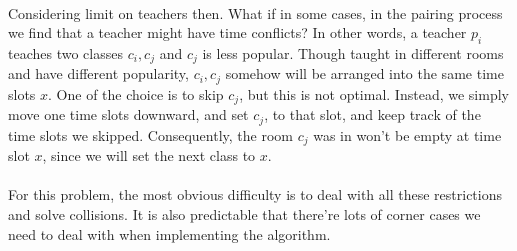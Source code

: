 \documentclass[11pt, oneside]{article}   	%
\begin{document}
\\Considering limit on teachers then. What if in some cases, in the pairing process we find that a teacher might have time conflicts? In other words, a teacher $p_i$ teaches two classes $c_i,c_j$ and $c_j$ is less popular. Though taught in different rooms and have different popularity, $c_i,c_j$ somehow will be arranged into the same time slots $x$. One of the choice is to skip $c_j$, but this is not optimal. Instead, we simply move one time slots downward, and set $c_j$, to that slot, and keep track of the time slots we skipped. Consequently, the room $c_j$ was in won't be empty at time slot $x$, since we will set the next class to $x$.\\
\\For this problem, the most obvious difficulty is to deal with all these restrictions and solve collisions. It is also predictable that there're lots of corner cases we need to deal with when implementing the algorithm. 
\end{document}
